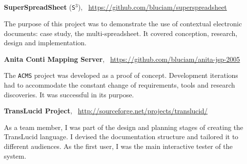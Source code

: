 \subsection*{\titleLogiciels}
\vspace*{-0.2cm}

{{\bf SuperSpreadSheet} (\texttt{S$^3$})},~
\href{https://github.com/bluciam/superspreadsheet}{
{\footnotesize{\url{ https://github.com/bluciam/superspreadsheet}}}
}

\hspace*{1cm}
\parbox{14cm}{
The purpose of this project was to demonstrate the use of contextual
electronic documents: case study, the multi-spreadsheet. It covered 
conception, research, design and implementation.
}

{\bf Anita Conti Mapping Server},~
\href{https://github.com/bluciam/anita-jsp-2005}{
{\footnotesize{\url{ https://github.com/bluciam/anita-jsp-2005}}}
}

\hspace*{1cm}
\parbox{14cm}{
The \texttt{ACMS}
project was developed as a proof of concept. Development iterations
had to accommodate the constant change of requirements, tools and
research discoveries. It was successful in its purpose.
}

\newpage

\vspace*{0.5cm}

{{\bf TransLucid Project}},~
\href{http://sourceforge.net/projects/translucid}{
{\footnotesize{\url{ http://sourceforge.net/projects/translucid/}}}
}

\hspace*{1cm}
\parbox{14cm}{
As a team member, I was part of the design and planning stages of creating
the TransLucid language.  I devised the documentation structure and tailored it
to different audiences. As the first user, I was the main interactive tester of the system.
}
